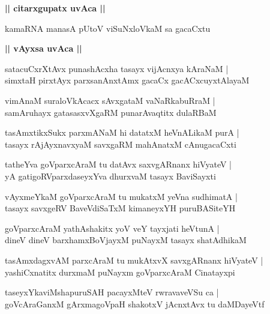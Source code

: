 \documentclass[twoside,12pt,openright]{book}
\newcounter{shloka}[chapter]
\def\uvaca#1{\centerline{{\large\textbf{#1}}}}
\begin{document}
\uvaca{|| citarxgupatx uvAca ||}

\begin{shloka}%
kamaRNA manasA pUtoV viSuNxloVkaM sa gacaCxtu
\end{shloka}

\uvaca{|| vAyxsa uvAca ||}

\begin{shloka}%
satacuCxrXtAvx punashAcxha tasayx vijAcnxya kAraNaM |\\
simxtaH pirxtAyx parxsanAnxtAmx gacaCx gacACxcuyxtAlayaM 
\end{shloka}

\begin{shloka}%
vimAnaM suraloVkAcacx sAvxgataM vaNaRkabuRraM |\\
samAruhayx gatasasxvXgaRM punarAvaqtitx dulaRBaM 
\end{shloka}

\begin{shloka}%
tasAmxtikxSukx parxmANaM hi datatxM heVnALikaM purA |\\
tasayx rAjAyxnavxyaM savxgaRM mahAnatxM cAnugacaCxti 
\end{shloka}

\begin{shloka}%
tatheYva goVparxcAraM tu datAvx saxvgARnanx hiVyateV |\\
yA gatigoRVparxdaseyxYva dhurxvaM tasayx BaviSayxti 
\end{shloka}

\begin{shloka}%
vAyxmeYkaM goVparxcAraM tu mukatxM yeVna sudhimatA |\\
tasayx savxgeRV BaveVdiSaTxM kimaneyxYH puruBASiteYH
\end{shloka}

\begin{shloka}%
goVparxcAraM yathAshakitx yoV veY tayxjati heVtunA |\\
dineV dineV barxhamxBoVjayxM puNayxM tasayx shatAdhikaM 
\end{shloka}

\begin{shloka}%
tasAmxdagxvAM parxcAraM tu mukAtxvX savxgARnanx hiVyateV |\\
yashiCxnatitx durxmaM puNayxm goVparxcAraM Cinatayxpi
\end{shloka}

\begin{shloka}%
taseyxYkaviMshapuruSAH pacayxMteV rwravaveVSu ca |\\
goVcAraGanxM gArxmagoVpaH shakotxV jAcnxtAvx tu daMDayeVtf
\end{shloka}
\end{document}
